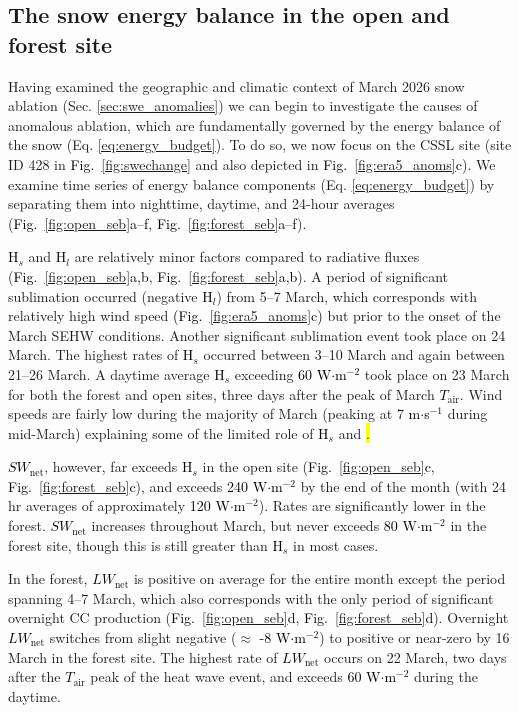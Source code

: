 \documentclass[draft]{agujournal2019}
\newcommand{\fig}[2]{\textcolor{black}{(Fig.~\ref{#1}{#2})}}   %
\newcommand{\fignop}[2]{\textcolor{black}{Fig.~\ref{#1}{#2}}}  %
\newcommand{\mynum}[1]{\textcolor{black}{#1}}
\newcommand{\tair}{\textcolor{black}{$T_{\mathrm{air}}$}\xspace}
\newcommand{\lwnet}{\textcolor{black}{$LW_{\mathrm{net}}$}\xspace}
\newcommand{\hs}{\textcolor{black}{H$_s$}\xspace}
\newcommand{\hlat}{\textcolor{black}{H$_l$}\xspace}
\newcommand{\swnet}{\textcolor{black}{$SW_{\mathrm{net}}$}\xspace}
\newcommand{\ms}{\textcolor{black}{m$\cdot$s$^{-1}$}\xspace}
\newcommand{\wmsq}{\textcolor{black}{W$\cdot$m$^{-2}$}\xspace}
\begin{document}
\subsection{The snow energy balance in the open and forest site}
Having examined the geographic and climatic context of March 2026 snow ablation (Sec. \ref{sec:swe_anomalies}) we can begin to investigate the causes of anomalous ablation, which are fundamentally governed by the energy balance of the snow (Eq. \ref{eq:energy_budget}). 
To do so, we now focus on the CSSL site (site ID 428 in \fignop{fig:swechange}{} and also depicted in \fignop{fig:era5_anoms}{c}).
We examine time series of energy balance components (Eq. \ref{eq:energy_budget}) by separating them into nighttime, daytime, and 24-hour averages (\fignop{fig:open_seb}{a--f}, \fignop{fig:forest_seb}{a--f}).

\hs and \hlat are relatively minor factors compared to radiative fluxes (\fignop{fig:open_seb}{a,b}, \fignop{fig:forest_seb}{a,b}).
A period of significant sublimation occurred (negative \hlat) from 5--7 March, which corresponds with relatively high wind speed \fig{fig:era5_anoms}{c} but prior to the onset of the March SEHW conditions.
Another significant sublimation event took place on 24 March.
The highest rates of \hs occurred between 3--10 March and again between 21--26 March.
A daytime average \hs exceeding \mynum{60} \wmsq took place on 23 March for both the forest and open sites, three days after the peak of March \tair.
Wind speeds are fairly low during the majority of March (peaking at 7 \ms during mid-March) explaining some of the limited role of \hs and \hl.

\swnet, however, far exceeds \hs in the open site (\fignop{fig:open_seb}{c}, \fignop{fig:forest_seb}{c}), and exceeds \mynum{240} \wmsq by the end of the month (with 24 hr averages of approximately \mynum{120} \wmsq).
Rates are significantly lower in the forest.
\swnet increases throughout March, but never exceeds \mynum{80} \wmsq in the forest site, though this is still greater than \hs in most cases.

In the forest, \lwnet is positive on average for the entire month except the period spanning 4--7 March, which also corresponds with the only period of significant overnight CC production (\fignop{fig:open_seb}{d}, \fignop{fig:forest_seb}{d}).
Overnight \lwnet switches from slight negative ($\approx$ \mynum{-8} \wmsq) to positive or near-zero by 16 March in the forest site.
The highest rate of \lwnet occurs on 22 March, two days after the \tair peak of the heat wave event, and exceeds \mynum{60} \wmsq during the daytime.
\end{document}
